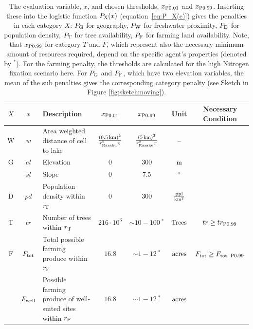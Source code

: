  \begin{table}
 	
	\centering
	\caption{The evaluation variable, $x$, and chosen thresholds, $x_{\rm P0.01}$ and $x_{\rm P0.99}$. %
		Inserting these into the logistic function $P_{\rm X}(x)$ (equation~\ref{eq:P_X(c)}) gives the penalties in each category $X$:
		$P_{\rm G}$ for geography, $P_{\rm W}$ for freshwater proximity, $P_{\rm D}$ for population density, $P_{\rm T}$ for tree availability, $P_{\rm F}$ for farming land availability.
		Note, that $x_{\rm P0.99}$ for category $T$ and $F$, which represent also the necessary minimum amount of resources required, depend on the specific agent's properties (denoted by $^*$).
		For the farming penalty, the thresholds are calculated for the high Nitrogen fixation scenario here.
		For $P_{\rm G}$ and $P_{\rm F}$, which have two elevation variables, the mean of the sub penalties gives the corresponding category penalty (see Sketch in Figure \ref{fig:sketchmoving}).}
	\begin{tabular}{c|c|L|c|c|c|S}
		$X$ & $x$& Description & $x_{\rm P0.01}$ & $x_{\rm P0.99}$ & Unit & Necessary Condition \\ \hline
		W &$w$ & Area weighted distance of cell to lake & $\frac{(0.5\, {\rm km})^2}{r_\text{Raraku}^2\pi}$ & $\frac{(5\, {\rm km})^2}{r_\text{Raraku}^2\pi}$& -- & \\
		G & $el$ & Elevation & $0$ & $300$ & $ {\rm m}$ & \\
		& $sl$ & Slope & $0$ & $7.5$ & $^\circ$ &  \\
		D & $pd$ & Population density within $r_{\rm F}$ & $0$ & $300$ & ${\rm \frac{ppl}{km^2}}$ &  \\
		T & $tr$ & Number of trees within $r_{\rm T}$ & $216\cdot 10^3$ & $\sim 10-100\ ^*$ & $ {\rm Trees}$ &  $tr \geq tr_{\rm P0.99}$\\
		F& $F_{\rm tot}$ & Total possible farming produce within $r_{\rm F}$ & $16.8$  & $\sim 1-12 \ ^*$& $ \rm{acres}$ &  $F_{\rm tot} \geq F_\text{tot, P0.99}$\\
		& $F_{\rm well}$ & Possible farming produce of well-suited sites within $r_{\rm F}$ & $16.8$  & $\sim 1-12 \ ^*$& $ \rm{acres}$ &  \\
	\end{tabular}
\label{tab:x01x09} 
\end{table}


